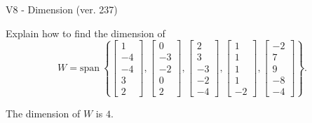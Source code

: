 \begin{exercise}
  \begin{exerciseTitle}V8 - Dimension (ver. 237)\end{exerciseTitle}
  \begin{exerciseStatement}
    Explain how to find the dimension of 
\[W=\mathrm{span}\ \left\{\left[\begin{array}{r}
1 \\
-4 \\
-4 \\
3 \\
2
\end{array}\right] , \left[\begin{array}{r}
0 \\
-3 \\
-2 \\
0 \\
2
\end{array}\right] , \left[\begin{array}{r}
2 \\
3 \\
-3 \\
-2 \\
-4
\end{array}\right] , \left[\begin{array}{r}
1 \\
1 \\
1 \\
1 \\
-2
\end{array}\right] , \left[\begin{array}{r}
-2 \\
7 \\
9 \\
-8 \\
-4
\end{array}\right]\right\}.\]



  \end{exerciseStatement}
  \begin{exerciseAnswer}
   The dimension of \(W\) is  \(4\).
  


  \end{exerciseAnswer}
\end{exercise}